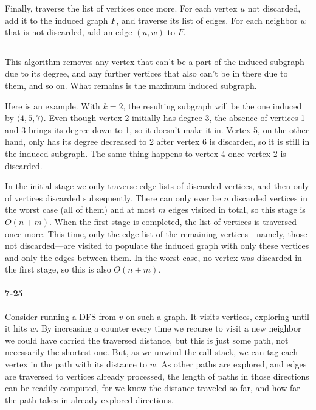 \documentclass{report}
\newcommand{\okthen}{\rule[-1.4pt]{0.3em}{0.77em}}
\begin{document}
Finally, traverse the list of vertices once more. For each vertex $u$ not discarded, add it to the induced graph $F$, and traverse its list of edges. For each neighbor $w$ that is not discarded, add an edge $(u,w)$ to $F$.\ \okthen

This algorithm removes any vertex that can't be a part of the induced subgraph due to its degree, and any further vertices that also can't be in there due to them, and so on. What remains is the maximum induced subgraph.

\smallskip

Here is an example. With $k=2$, the resulting subgraph will be the one induced by $\langle4,5,7\rangle$. Even though vertex 2 initially has degree 3, the absence of vertices 1 and 3 brings its degree down to 1, so it doesn't make it in. Vertex 5, on the other hand, only has its degree decreased to 2 after vertex 6 is discarded, so it is still in the induced subgraph. The same thing happens to vertex 4 once vertex 2 is discarded.

\begin{center}
\end{center}

In the initial stage we only traverse edge lists of discarded vertices, and then only of vertices discarded subsequently. There can only ever be $n$ discarded vertices in the worst case (all of them) and at most $m$ edges visited in total, so this stage is $O(n+m)$. When the first stage is completed, the list of vertices is traversed once more. This time, only the edge list of the remaining vertices---namely, those not discarded---are visited to populate the induced graph with only these vertices and only the edges between them. In the worst case, no vertex was discarded in the first stage, so this is also $O(n+m)$.

\paragraph{7-25} Consider running a DFS from $v$ on such a graph. It visits vertices, exploring until it hits $w$. By increasing a counter every time we recurse to visit a new neighbor we could have carried the traversed distance, but this is just some path, not necessarily the shortest one. But, as we unwind the call stack, we can tag each vertex in the path with its distance to $w$. As other paths are explored, and edges are traversed to vertices already processed, the length of paths in those directions can be readily computed, for we know the distance traveled so far, and how far the path takes in already explored directions.
\end{document}
